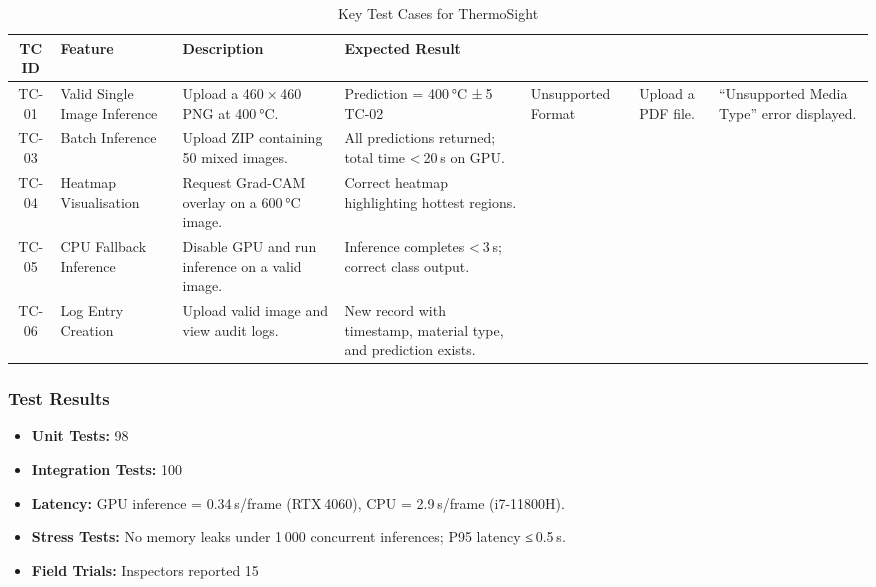 \begin{table}[H]
    \centering
    \caption{Key Test Cases for ThermoSight}
    \fontsize{10}{12}\selectfont
    \renewcommand{\arraystretch}{1.2}
    \begin{tabularx}{\textwidth}{|c|X|X|X|}
        \hline
        \textbf{TC ID} & \textbf{Feature}                   & \textbf{Description}                                                       & \textbf{Expected Result}                                        \\ \hline
        TC-01          & Valid Single Image Inference       & Upload a 460 × 460 PNG at 400 °C.                                            & Prediction = 400 °C ± 5 %
        TC-02          & Unsupported Format                 & Upload a PDF file.                                                          & “Unsupported Media Type” error displayed.                        \\ \hline
        TC-03          & Batch Inference                    & Upload ZIP containing 50 mixed images.                                       & All predictions returned; total time < 20 s on GPU.             \\ \hline
        TC-04          & Heatmap Visualisation              & Request Grad-CAM overlay on a 600 °C image.                                  & Correct heatmap highlighting hottest regions.                   \\ \hline
        TC-05          & CPU Fallback Inference             & Disable GPU and run inference on a valid image.                              & Inference completes < 3 s; correct class output.                \\ \hline
        TC-06          & Log Entry Creation                 & Upload valid image and view audit logs.                                      & New record with timestamp, material type, and prediction exists.\\ \hline
    \end{tabularx}
\end{table}

\subsubsection{Test Results}
\begin{itemize}
    \item \textbf{Unit Tests:} 98 %
    \item \textbf{Integration Tests:} 100 %
    \item \textbf{Latency:} GPU inference = 0.34 s/frame (RTX 4060), CPU = 2.9 s/frame (i7-11800H).
    \item \textbf{Stress Tests:} No memory leaks under 1 000 concurrent inferences; P95 latency ≤ 0.5 s.
    \item \textbf{Field Trials:} Inspectors reported 15 %
\end{itemize}


